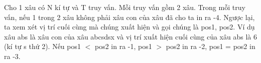 Cho 1 xâu có N kí tự và T truy vấn. Mỗi truy vấn gồm 2 xâu. Trong mỗi truy vấn, nếu 1 trong 2 xâu không phải xâu con của xâu đã cho ta in ra -4. Ngược lại, ta xem xét vị trí cuối cùng mà chúng xuất hiện và gọi chúng là pos1, pos2. Ví dụ xâu abs là xâu con của xâu abcsdsx và vị trí xuất hiện cuối cùng của xâu abs là 6 (kí tự s thứ 2). Nếu pos1 $<$ pos2 in ra -1, pos1 $>$ pos2 in ra -2, pos1 = pos2 in ra -3.